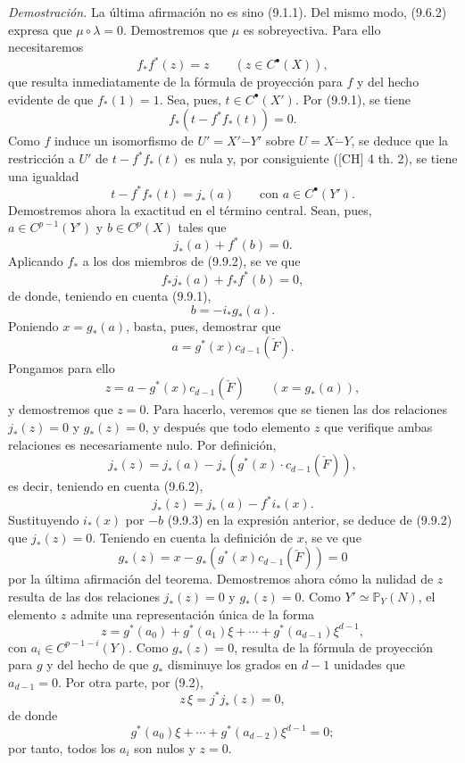 \emph{Demostración.} La última afirmación no es sino (9.1.1). Del mismo modo, (9.6.2) expresa que $\mu\circ\lambda=0$. Demostremos que $\mu$ es sobreyectiva. Para ello necesitaremos
\[
f_*f^*(z)=z\qquad(z\in C^{\bullet}(X)),
\tag{9.9.1}
\]
que resulta inmediatamente de la fórmula de proyección para $f$ y del hecho evidente de que $f_*(1)=1$. Sea, pues, $t\in C^{\bullet}(X')$. Por (9.9.1), se tiene
\[
f_*(t-f^*f_*(t))=0.
\]
Como $f$ induce un isomorfismo de $U'=X'\mathbin{\dot{-}}Y'$ sobre $U=X\mathbin{\dot{-}}Y$, se deduce que la restricción a $U'$ de $t-f^*f_*(t)$ es nula y, por consiguiente ([CH] 4 th. 2), se tiene una igualdad
\[
t-f^*f_*(t)=j_*(a)
\qquad\text{con }a\in C^{\bullet}(Y').
\]
Demostremos ahora la exactitud en el término central. Sean, pues, $a\in C^{p-1}(Y')$ y $b\in C^p(X)$ tales que
\[
j_*(a)+f^*(b)=0.
\tag{9.9.2}
\]
Aplicando $f_*$ a los dos miembros de (9.9.2), se ve que
\[
f_*j_*(a)+f_*f^*(b)=0,
\]
de donde, teniendo en cuenta (9.9.1),
\[
b=-i_*g_*(a).
\tag{9.9.3}
\]
Poniendo $x=g_*(a)$, basta, pues, demostrar que
\[
a=g^*(x)c_{d-1}(\check F).
\tag{9.9.4}
\]
Pongamos para ello
\[
z=a-g^*(x)c_{d-1}(\check F)\qquad(x=g_*(a)),
\]
y demostremos que $z=0$. Para hacerlo, veremos que se tienen las dos relaciones $j_*(z)=0$ y $g_*(z)=0$, y después que todo elemento $z$ que verifique ambas relaciones es necesariamente nulo. Por definición,
\[
j_*(z)=j_*(a)-j_*(g^*(x)\cdot c_{d-1}(\check F)),
\]
es decir, teniendo en cuenta (9.6.2),
\[
j_*(z)=j_*(a)-f^*i_*(x).
\]
Sustituyendo $i_*(x)$ por $-b$ (9.9.3) en la expresión anterior, se deduce de (9.9.2) que $j_*(z)=0$. Teniendo en cuenta la definición de $x$, se ve que
\[
g_*(z)=x-g_*(g^*(x)c_{d-1}(\check F))=0
\]
por la última afirmación del teorema. Demostremos ahora cómo la nulidad de $z$ resulta de las dos relaciones $j_*(z)=0$ y $g_*(z)=0$. Como $Y'\simeq\mathbb P_Y(N)$, el elemento $z$ admite una representación única de la forma
\[
z=g^*(a_0)+g^*(a_1)\xi+\cdots+g^*(a_{d-1})\xi^{d-1},
\]
con $a_i\in C^{p-1-i}(Y)$. Como $g_*(z)=0$, resulta de la fórmula de proyección para $g$ y del hecho de que $g_*$ disminuye los grados en $d-1$ unidades que $a_{d-1}=0$. Por otra parte, por (9.2),
\[
z\,\xi=j^*j_*(z)=0,
\]
de donde
\[
g^*(a_0)\xi+\cdots+g^*(a_{d-2})\xi^{d-1}=0;
\]
por tanto, todos los $a_i$ son nulos y $z=0$.

